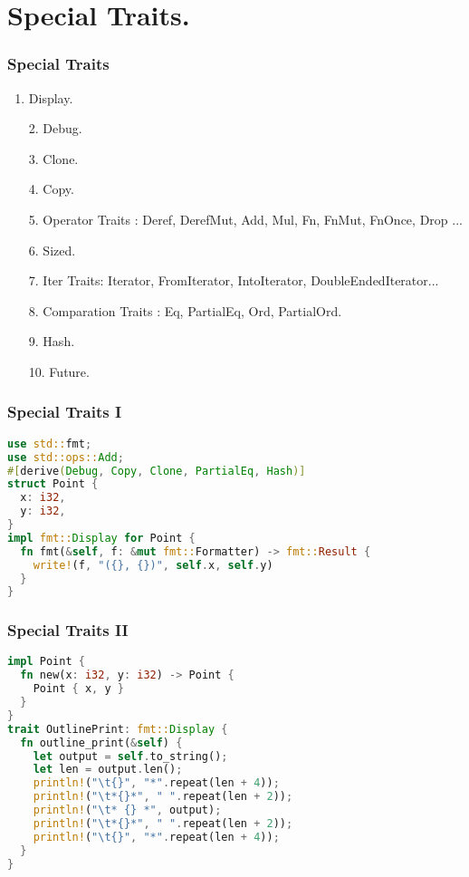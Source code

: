 \documentclass{beamer}
\begin{document}
\section{Special Traits.}
\begin{frame}
  \frametitle{Special Traits}
  \begin{enumerate}[1.]
    \item Display.
    \pause
    \item    [2.] Debug.
    \pause
    \item    [3.] Clone.
    \pause
    \item    [4.] Copy.
    \pause
    \item    [5.] Operator Traits : Deref, DerefMut, Add, Mul, Fn, FnMut, FnOnce, Drop ...
    \pause
    \item    [6.] Sized.
    \pause
    \item    [7.] Iter Traits: Iterator, FromIterator, IntoIterator, DoubleEndedIterator...
    \pause
    \item    [8.] Comparation Traits :  Eq, PartialEq, Ord, PartialOrd.
    \pause
    \item    [9.] Hash.
    \pause
    \item    [10.] Future.
    
  \end{enumerate}
\end{frame}

\begin{frame}[fragile]
  \frametitle{Special Traits I}
  \begin{lstlisting}[language=Rust, style=boxed ]
use std::fmt;
use std::ops::Add;
#[derive(Debug, Copy, Clone, PartialEq, Hash)]
struct Point {
  x: i32,
  y: i32,
}
impl fmt::Display for Point {
  fn fmt(&self, f: &mut fmt::Formatter) -> fmt::Result {
    write!(f, "({}, {})", self.x, self.y)
  }
}\end{lstlisting}
\end{frame}

\begin{frame}[fragile]
  \frametitle{Special Traits II}
  \begin{lstlisting}[language=Rust, style=boxed ]
impl Point {
  fn new(x: i32, y: i32) -> Point {
    Point { x, y }
  }
}
trait OutlinePrint: fmt::Display {
  fn outline_print(&self) {
    let output = self.to_string();
    let len = output.len();
    println!("\t{}", "*".repeat(len + 4));
    println!("\t*{}*", " ".repeat(len + 2));
    println!("\t* {} *", output);
    println!("\t*{}*", " ".repeat(len + 2));
    println!("\t{}", "*".repeat(len + 4));
  }
}\end{lstlisting}
\end{frame}
\end{document}
